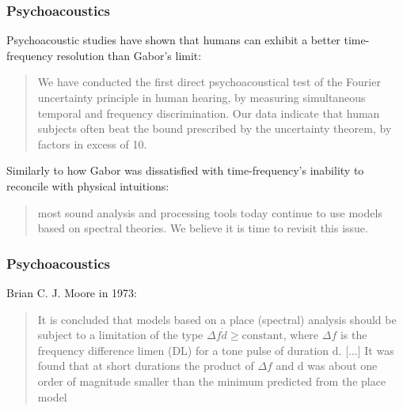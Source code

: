 \documentclass{beamer}
\begin{document}

\begin{frame}
	\frametitle{Psychoacoustics}
	Psychoacoustic studies have shown that humans can exhibit a better time-frequency resolution than Gabor's limit:
	\begin{quote}
		We have conducted the first direct psychoacoustical test of the Fourier uncertainty principle in human hearing, by measuring simultaneous temporal and frequency discrimination. Our data indicate that human subjects often beat the bound prescribed by the uncertainty theorem, by factors in excess of 10.
	\end{quote}
	Similarly to how Gabor was dissatisfied with time-frequency's inability to reconcile with physical intuitions:
	\begin{quote}
		most sound analysis and processing tools today continue to use models based on spectral theories. We believe it is time to revisit this issue.
	\end{quote}
\end{frame}


\begin{frame}
	\frametitle{Psychoacoustics}
	Brian C. J. Moore in 1973:
	\begin{quote}
		It is concluded that models based on a place (spectral) analysis should be subject to a limitation of the type $\Delta f \dot d \ge \text{constant}$, where $\Delta f$ is the frequency difference limen (DL) for a tone pulse of duration d. [...]  It was found that at short durations the product of $\Delta f$ and d was about one order of magnitude smaller than the minimum predicted from the place model
	\end{quote}
\end{frame}

\end{document}
